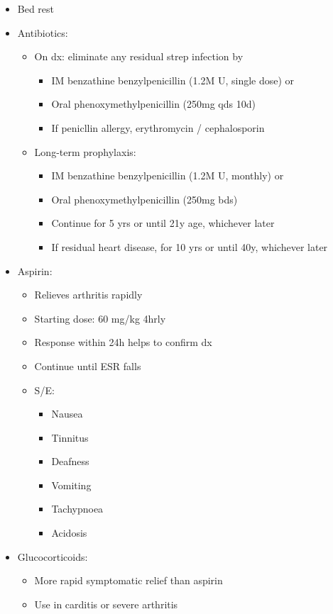 \documentclass[
  12pt,
]{memoir}
\providecommand{\tightlist}{%
  \setlength{\itemsep}{0pt}\setlength{\parskip}{0pt}}
\begin{document}
\begin{itemize}
\tightlist
\item
  Bed rest
\item
  Antibiotics:

  \begin{itemize}
  \tightlist
  \item
    On dx: eliminate any residual strep infection by

    \begin{itemize}
    \tightlist
    \item
      IM benzathine benzylpenicillin (1.2M U, single dose) or
    \item
      Oral phenoxymethylpenicillin (250mg qds 10d)
    \item
      If penicllin allergy, erythromycin / cephalosporin
    \end{itemize}
  \item
    Long-term prophylaxis:

    \begin{itemize}
    \tightlist
    \item
      IM benzathine benzylpenicillin (1.2M U, monthly) or
    \item
      Oral phenoxymethylpenicillin (250mg bds)
    \item
      Continue for 5 yrs or until 21y age, whichever later
    \item
      If residual heart disease, for 10 yrs or until 40y, whichever
      later
    \end{itemize}
  \end{itemize}
\item
  Aspirin:

  \begin{itemize}
  \tightlist
  \item
    Relieves arthritis rapidly
  \item
    Starting dose: 60 mg/kg 4hrly
  \item
    Response within 24h helps to confirm dx
  \item
    Continue until ESR falls
  \item
    S/E:

    \begin{itemize}
    \tightlist
    \item
      Nausea
    \item
      Tinnitus
    \item
      Deafness
    \item
      Vomiting
    \item
      Tachypnoea
    \item
      Acidosis
    \end{itemize}
  \end{itemize}
\item
  Glucocorticoids:

  \begin{itemize}
  \tightlist
  \item
    More rapid symptomatic relief than aspirin
  \item
    Use in carditis or severe arthritis
  \end{itemize}
\end{itemize}
\end{document}
